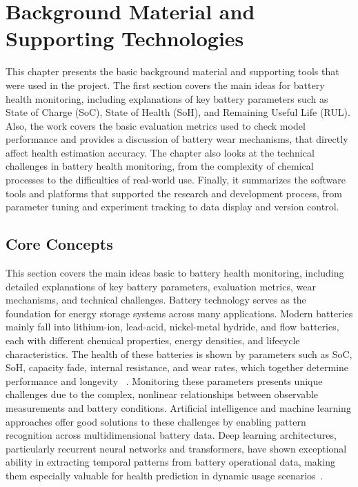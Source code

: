 \chapter{Background Material and Supporting Technologies}
\label{ch:background}

This chapter presents the basic background material and supporting tools that were used in the project. The first section covers the main ideas for battery health monitoring, including explanations of key battery parameters such as State of Charge (SoC), State of Health (SoH), and Remaining Useful Life (RUL). Also, the work covers the basic evaluation metrics used to check model performance and provides a discussion of battery wear mechanisms, that directly affect health estimation accuracy. The chapter also looks at the technical challenges in battery health monitoring, from the complexity of chemical processes to the difficulties of real-world use. Finally, it summarizes the software tools and platforms that supported the research and development process, from parameter tuning and experiment tracking to data display and version control.

\section{Core Concepts}

This section covers the main ideas basic to battery health monitoring, including detailed explanations of key battery parameters, evaluation metrics, wear mechanisms, and technical challenges. Battery technology serves as the foundation for energy storage systems across many applications. Modern batteries mainly fall into lithium-ion, lead-acid, nickel-metal hydride, and flow batteries, each with different chemical properties, energy densities, and lifecycle characteristics. The health of these batteries is shown by parameters such as SoC, SoH, capacity fade, internal resistance, and wear rates, which together determine performance and longevity ~\cite{vijaychandra_comprehensive_2024}. Monitoring these parameters presents unique challenges due to the complex, nonlinear relationships between observable measurements and battery conditions. Artificial intelligence and machine learning approaches offer good solutions to these challenges by enabling pattern recognition across multidimensional battery data. Deep learning architectures, particularly recurrent neural networks and transformers, have shown exceptional ability in extracting temporal patterns from battery operational data, making them especially valuable for health prediction in dynamic usage scenarios~\cite{renold_comprehensive_2024}. 

